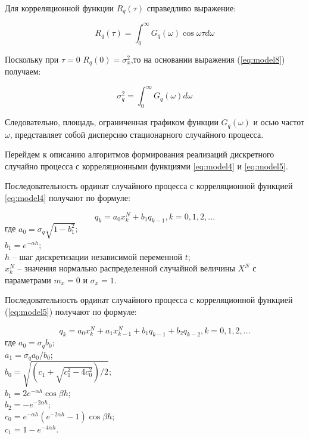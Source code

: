 Для корреляционной функции ${R}_{q}(\tau)$ справедливо выражение:

\begin{equation} \label{eq:model8}
R_q(\tau) = \int_{0}^{\infty} G_q(\omega) \cos\omega\tau d\omega
\end{equation}

Поскольку при $\tau = 0$ $R_q(0) = {\sigma}_{x}^{2}$,то на основании выражения (\ref{eq:model8}) получаем:

\begin{equation} \label{eq:model9}
{\sigma}_{q}^{2} = \int_{0}^{\infty} G_q(\omega) d\omega
\end{equation}

Следовательно, площадь, ограниченная графиком функции $G_q(\omega)$ и осью
частот $\omega$, представляет собой дисперсию стационарного случайного процесса.

Перейдем к описанию алгоритмов формирования реализаций дискретного
случайно процесса с корреляционными функциями \ref{eq:model4} и \ref{eq:model5}.

Последовательность ординат случайного процесса с корреляционной
функцией \ref{eq:model4} получают по формуле:

\begin{equation} \label{eq:model10}
{q}_{k} = a_0 x_{k}^{N} + b_1 q_{k-1}, k=0,1,2,...
\end{equation}
где $a_0 = \sigma_q \sqrt{1 - b_1^2}$;\\
$b_1 = e^{-\alpha h}$;\\
$h$ -- шаг дискретизации независимой переменной $t$;\\
$x_k^N$ -- значения нормально распределенной случайной величины $X^N$ с
параметрами $m_x = 0$ и $\sigma_x = 1$.

Последовательность ординат случайного процесса с корреляционной
функцией (\ref{eq:model5}) получают по формуле:

\begin{equation} \label{eq:model11}
{q}_{k} = a_0 x_{k}^{N} + a_1 x_{k-1}^{N} +  b_1 q_{k-1} +  b_2 q_{k-2}, k=0,1,2,...
\end{equation}
где $a_0 = \sigma_q b_0$;\\
$a_1 = \sigma_q a_0 / b_0$;\\
$b_0 = \sqrt{(c_1 + \sqrt{c_1^2 - 4c_0^2})/2}$;\\
$b_1 = 2e^{-\alpha h} \cos\beta h$;\\
$b_2 = -e^{-2\alpha h}$;\\
$c_0 = e^{-\alpha h} (e^{-2\alpha h} - 1) \cos\beta h$;\\
$c_1 = 1 - e^{-4\alpha h}$.

